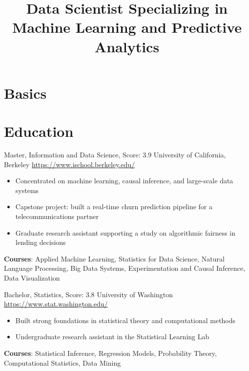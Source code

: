 \documentclass[a4paper, serif, 10pt]{moderncv}
\title{Data Scientist Specializing in Machine Learning and Predictive Analytics}
\begin{document}
\maketitle

\section{Basics}

\section{Education}

        {Master, Information and Data Science, Score: 3.9}
        {University of California, Berkeley}
        {\url{https://www.ischool.berkeley.edu/}}
        {}
        {\begin{itemize}
\item Concentrated on machine learning, causal inference, and large-scale data systems
\item Capstone project: built a real-time churn prediction pipeline for a telecommunications partner
\item Graduate research assistant supporting a study on algorithmic fairness in lending decisions
\end{itemize}
\textbf{Courses}: Applied Machine Learning, Statistics for Data Science, Natural Language Processing, Big Data Systems, Experimentation and Causal Inference, Data Visualization}

        {Bachelor, Statistics, Score: 3.8}
        {University of Washington}
        {\url{https://www.stat.washington.edu/}}
        {}
        {\begin{itemize}
\item Built strong foundations in statistical theory and computational methods
\item Undergraduate research assistant in the Statistical Learning Lab
\end{itemize}
\textbf{Courses}: Statistical Inference, Regression Models, Probability Theory, Computational Statistics, Data Mining}
\end{document}
